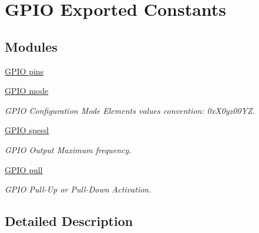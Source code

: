 \hypertarget{group___g_p_i_o___exported___constants}{\section{G\-P\-I\-O Exported Constants}
\label{group___g_p_i_o___exported___constants}
}
\subsection*{Modules}
\begin{DoxyCompactItemize}
\item 
\hyperlink{group___g_p_i_o__pins}{G\-P\-I\-O pins}
\item 
\hyperlink{group___g_p_i_o__mode}{G\-P\-I\-O mode}
\begin{DoxyCompactList}\small\item\em G\-P\-I\-O Configuration Mode Elements values convention\-: 0x\-X0yz00\-Y\-Z. \end{DoxyCompactList}\item 
\hyperlink{group___g_p_i_o__speed}{G\-P\-I\-O speed}
\begin{DoxyCompactList}\small\item\em G\-P\-I\-O Output Maximum frequency. \end{DoxyCompactList}\item 
\hyperlink{group___g_p_i_o__pull}{G\-P\-I\-O pull}
\begin{DoxyCompactList}\small\item\em G\-P\-I\-O Pull-\/\-Up or Pull-\/\-Down Activation. \end{DoxyCompactList}\end{DoxyCompactItemize}


\subsection{Detailed Description}
